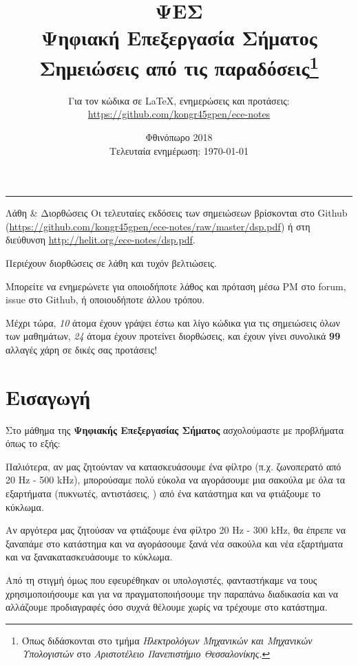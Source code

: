 \documentclass[11pt,a4paper,notitlepage,fleqn,draft]{article}
\title{ΨΕΣ
	\\
	{ 
		\normalsize Ψηφιακή Επεξεργασία Σήματος
		\\
		\normalsize Σημειώσεις από τις παραδόσεις\footnote{Όπως διδάσκονται στο τμήμα \textit{Ηλεκτρολόγων Μηχανικών και Μηχανικών Υπολογιστών} στο \textit{Αριστοτέλειο Πανεπιστήμιο Θεσσαλονίκης}.}
	}}
\date{Φθινόπωρο 2018
	\\
	{ 
		\small Τελευταία ενημέρωση: \today
	}
}
\author{
	Για τον κώδικα σε \LaTeX, ενημερώσεις και προτάσεις:
	\\
	\url{https://github.com/kongr45gpen/ece-notes}}
\let\mytodo\todo
\renewcommand{\todo}[1]{\par\mytodo[inline,noline]{#1}}
\begin{document}
\maketitle

\hrule
\vspace{50pt}

\begin{infobox}{Λάθη \& Διορθώσεις}
	Οι τελευταίες εκδόσεις των σημειώσεων βρίσκονται στο Github
	(\url{https://github.com/kongr45gpen/ece-notes/raw/master/dsp.pdf}) ή
	στη διεύθυνση \url{http://helit.org/ece-notes/dsp.pdf}.
	
	Περιέχουν διορθώσεις σε λάθη και τυχόν βελτιώσεις.
	
	\tcblower
	
	Μπορείτε να ενημερώνετε για οποιοδήποτε λάθος και πρόταση
	μέσω PM στο forum, issue στο Github, ή οποιουδήποτε άλλου τρόπου.
	
	Μέχρι τώρα, \emph{10} άτομα έχουν γράψει έστω και λίγο κώδικα για τις σημειώσεις όλων των μαθημάτων, \emph{24} άτομα έχουν προτείνει διορθώσεις, και έχουν γίνει συνολικά \textbf{99} αλλαγές χάρη σε δικές σας προτάσεις!
\end{infobox}

\todo{Add PDF links}

{
	\hypersetup{linkcolor=black}
	\listoflecture
	\tableofcontents
}

\newpage

\section{Εισαγωγή}

	
Στο μάθημα της \textbf{Ψηφιακής Επεξεργασίας Σήματος} ασχολούμαστε
με προβλήματα όπως το εξής:

Παλιότερα, αν μας ζητούνταν να κατασκευάσουμε ένα φίλτρο (π.χ.
ζωνοπερατό από 20 Hz - 500 kHz), μπορούσαμε πολύ εύκολα να αγοράσουμε μια σακούλα με
όλα τα εξαρτήματα (πυκνωτές, αντιστάσεις, \textellipsis) από ένα
κατάστημα και να φτιάξουμε το κύκλωμα.

Αν αργότερα μας ζητούσαν να φτιάξουμε ένα φίλτρο 20 Hz - 300 kHz, θα
έπρεπε να ξαναπάμε στο κατάστημα και να αγοράσουμε ξανά νέα σακούλα και νέα εξαρτήματα
και να ξανακατασκευάσουμε το κύκλωμα.

Από τη στιγμή όμως που εφευρέθηκαν οι υπολογιστές, φανταστήκαμε να τους
χρησιμοποιήσουμε και για να πραγματοποιήσουμε την παραπάνω διαδικασία και
να αλλάζουμε προδιαγραφές όσο συχνά θέλουμε χωρίς να τρέχουμε στο κατάστημα.
\end{document}
